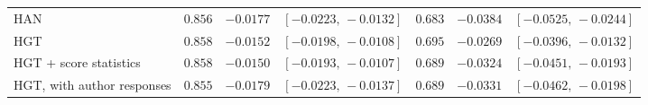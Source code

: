 \begin{table}[t]
\begin{tabular}{@{}lrrrrrr@{}}
HAN & $0.856$ & $-0.0177$ & $[-0.0223,\,-0.0132]$ & $0.683$ & $-0.0384$ & $[-0.0525,\,-0.0244]$ \\
HGT & $0.858$ & $-0.0152$ & $[-0.0198,\,-0.0108]$ & $0.695$ & $-0.0269$ & $[-0.0396,\,-0.0132]$ \\
HGT + score statistics & $0.858$ & $-0.0150$ & $[-0.0193,\,-0.0107]$ & $0.689$ & $-0.0324$ & $[-0.0451,\,-0.0193]$ \\
HGT, with author responses & $0.855$ & $-0.0179$ & $[-0.0223,\,-0.0137]$ & $0.689$ & $-0.0331$ & $[-0.0462,\,-0.0198]$ \\
\bottomrule
\end{tabular}
\end{table}
